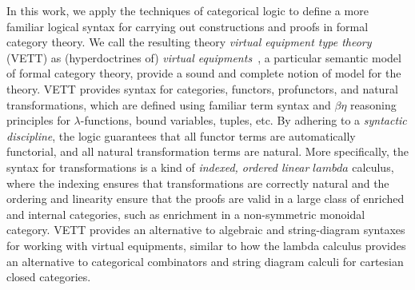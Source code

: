\documentclass{llncs}
\begin{document}
In this work, we apply the techniques of categorical logic to define a
more familiar logical syntax for carrying out constructions and proofs
in formal category theory.  
%
We call the resulting theory \emph{virtual equipment type theory} (VETT)
as (hyperdoctrines of) \emph{virtual
  equipments}~\cite{LEINSTER2002391,Cruttwell2010}, a particular semantic model of
formal category theory, provide a sound and complete notion of model for
the theory.
%
VETT provides syntax for categories, functors, profunctors, and natural
transformations, which are defined using familiar term syntax and
$\beta\eta$ reasoning principles for $\lambda$-functions, bound
variables, tuples, etc.  
%
By adhering to a \emph{syntactic discipline}, the logic guarantees
that all functor terms are automatically functorial, and all natural
transformation terms are natural.
%
More specifically, the syntax for transformations is a kind of
\emph{indexed, ordered linear} $lambda$ calculus, where the indexing
ensures that transformations are correctly natural and the ordering and
linearity ensure that the proofs are valid in a large class of enriched
and internal categories, such as enrichment in a non-symmetric monoidal
category.
%
VETT provides an alternative to algebraic and
string-diagram syntaxes for working with virtual equipments,
similar to how the lambda calculus provides an alternative to
categorical combinators and string diagram calculi for cartesian
closed categories.




%
\end{document}
